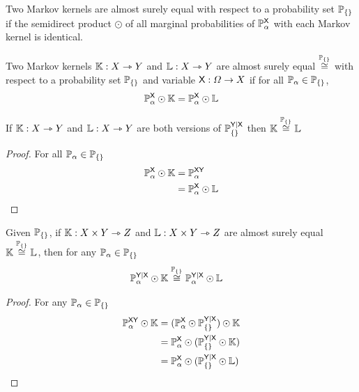 Two Markov kernels are almost surely equal with respect to a probability set $\mathbb{P}_{\{\}}$ if the semidirect product $\odot$ of all marginal probabilities of $\mathbb{P}_\alpha^{\mathsf{X}}$ with each Markov kernel is identical.

\begin{definition}\label{def:asequal}
Two Markov kernels $\mathbb{K}:X\rightarrowtriangle Y$ and $\mathbb{L}:X\rightarrowtriangle Y$ are almost surely equal $\overset{\mathbb{P}_{\{\}}}{\cong}$ with respect to a probability set $\mathbb{P}_{\{\}}$ and variable $\mathsf{X}:\Omega\to X$ if for all $\mathbb{P}_\alpha \in \mathbb{P}_{\{\}}$,
\begin{align}
	\mathbb{P}^{\mathsf{X}}_\alpha\odot \mathbb{K}=\mathbb{P}^{\mathsf{X}}_\alpha\odot \mathbb{L}
\end{align}
\end{definition}

\begin{lemma}
If $\mathbb{K}:X\rightarrowtriangle Y$ and $\mathbb{L}:X\rightarrowtriangle Y$ are both versions of $\mathbb{P}_{\{\}}^{\mathsf{Y}|\mathsf{X}}$ then $\mathbb{K}\overset{\mathbb{P}_{\{\}}}{\cong}\mathbb{L}$
\end{lemma}

\begin{proof}
For all $\mathbb{P}_\alpha \in \mathbb{P}_{\{\}}$
\begin{align}
	\mathbb{P}^{\mathsf{X}}_\alpha\odot \mathbb{K} &= \mathbb{P}^{\mathsf{XY}}_\alpha\\
	&= \mathbb{P}^{\mathsf{X}}_\alpha\odot \mathbb{L}
\end{align}
\end{proof}

\begin{lemma}\label{lem:sub_asequal}
Given $\mathbb{P}_{\{\}}$, if $\mathbb{K}:X\times Y \rightarrowtriangle Z$ and $\mathbb{L}:X\times Y \rightarrowtriangle Z$ are almost surely equal $\mathbb{K}\overset{\mathbb{P}_{\{\}}}{\cong}\mathbb{L}$, then for any $\mathbb{P}_\alpha\in \mathbb{P}_{\{\}}$
\begin{align}
	\mathbb{P}_\alpha^{\mathsf{Y}|\mathsf{X}}\odot \mathbb{K} &\overset{\mathbb{P}_{\{\}}}{\cong} \mathbb{P}_\alpha^{\mathsf{Y}|\mathsf{X}}\odot \mathbb{L}
\end{align}
\end{lemma}

\begin{proof}
For any $\mathbb{P}_\alpha\in\mathbb{P}_{\{\}}$
\begin{align}
	\mathbb{P}_\alpha^{\mathsf{XY}}\odot \mathbb{K} &= (\mathbb{P}_\alpha^{\mathsf{X}}\odot \mathbb{P}_{\{\}}^{\mathsf{Y}|\mathsf{X}})\odot \mathbb{K}\\
											  &= \mathbb{P}_\alpha^{\mathsf{X}}\odot (\mathbb{P}_{\{\}}^{\mathsf{Y}|\mathsf{X}}\odot \mathbb{K})\\
											  &= \mathbb{P}_\alpha^{\mathsf{X}}\odot (\mathbb{P}_{\{\}}^{\mathsf{Y}|\mathsf{X}}\odot \mathbb{L})
\end{align}
\end{proof}

